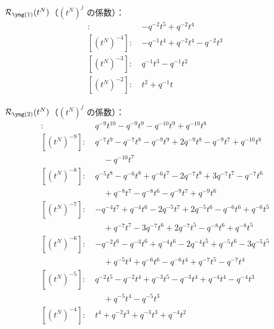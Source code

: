 $\Rred_{\yone}(t^N)$（$(t^N)^j$ の係数）：
\begin{align*}
[(t^N)^{-5}]\colon\ & -q^{-2} t^{5} +q^{-2} t^{4} \\
[(t^N)^{-4}]\colon\ & -q^{-1} t^{4} +q^{-2} t^{4} -q^{-2} t^{3} \\
[(t^N)^{-3}]\colon\ & q^{-1} t^{3} -q^{-1} t^{2} \\
[(t^N)^{-2}]\colon\ & t^{2} +q^{-1} t
\end{align*}

$\Rred_{\ytwo}(t^N)$（$(t^N)^j$ の係数）：
\begin{align*}
[(t^N)^{-10}]\colon\ & q^{-9} t^{10} -q^{-9} t^{9} -q^{-10} t^{9} +q^{-10} t^{8} \\
[(t^N)^{-9}]\colon\ & q^{-7} t^{9} -q^{-7} t^{8} -q^{-9} t^{9} +2 q^{-9} t^{8} -q^{-9} t^{7} +q^{-10} t^{8} \\
& \quad -q^{-10} t^{7} \\
[(t^N)^{-8}]\colon\ & q^{-5} t^{8} -q^{-6} t^{8} +q^{-6} t^{7} -2 q^{-7} t^{8} +3 q^{-7} t^{7} -q^{-7} t^{6} \\
& \quad +q^{-8} t^{7} -q^{-8} t^{6} -q^{-9} t^{7} +q^{-9} t^{6} \\
[(t^N)^{-7}]\colon\ & -q^{-4} t^{7} +q^{-4} t^{6} -2 q^{-5} t^{7} +2 q^{-5} t^{6} -q^{-6} t^{6} +q^{-6} t^{5} \\
& \quad +q^{-7} t^{7} -3 q^{-7} t^{6} +2 q^{-7} t^{5} -q^{-8} t^{6} +q^{-8} t^{5} \\
[(t^N)^{-6}]\colon\ & -q^{-2} t^{6} -q^{-3} t^{6} +q^{-4} t^{6} -2 q^{-4} t^{5} +q^{-5} t^{6} -3 q^{-5} t^{5} \\
& \quad +q^{-5} t^{4} +q^{-6} t^{6} -q^{-6} t^{4} +q^{-7} t^{5} -q^{-7} t^{4} \\
[(t^N)^{-5}]\colon\ & q^{-2} t^{5} -q^{-2} t^{4} +q^{-3} t^{5} -q^{-3} t^{4} +q^{-4} t^{4} -q^{-4} t^{3} \\
& \quad +q^{-5} t^{4} -q^{-5} t^{3} \\
[(t^N)^{-4}]\colon\ & t^{4} +q^{-2} t^{3} +q^{-3} t^{3} +q^{-4} t^{2}
\end{align*}


